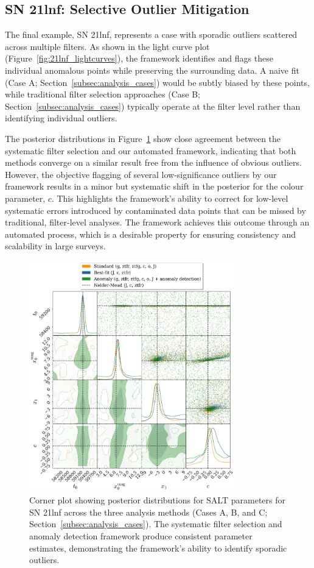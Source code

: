 \subsection{SN 21lnf: Selective Outlier Mitigation}
\label{subsec:sn21lnf}

The final example, SN 21lnf, represents a case with sporadic outliers scattered across multiple filters. As shown in the light curve plot (Figure~\ref{fig:21lnf_lightcurves}), the framework identifies and flags these individual anomalous points while preserving the surrounding data. A naive fit (Case A; Section~\ref{subsec:analysis_cases}) would be subtly biased by these points, while traditional filter selection approaches (Case B; Section~\ref{subsec:analysis_cases}) typically operate at the filter level rather than identifying individual outliers.

The posterior distributions in Figure~\ref{fig:21lnf_corner} show close agreement between the systematic filter selection and our automated framework, indicating that both methods converge on a similar result free from the influence of obvious outliers. However, the objective flagging of several low-significance outliers by our framework results in a minor but systematic shift in the posterior for the colour parameter, $c$. This highlights the framework's ability to correct for low-level systematic errors introduced by contaminated data points that can be missed by traditional, filter-level analyses. The framework achieves this outcome through an automated process, which is a desirable property for ensuring consistency and scalability in large surveys.

\begin{figure}
\centering
\includegraphics[width=0.8\textwidth]{images/corner_comparison_21lnf_paper_quality.png}
\caption{Corner plot showing posterior distributions for SALT parameters for SN 21lnf across the three analysis methods (Cases A, B, and C; Section~\ref{subsec:analysis_cases}). The systematic filter selection and anomaly detection framework produce consistent parameter estimates, demonstrating the framework's ability to identify sporadic outliers.}
\label{fig:21lnf_corner}
\end{figure}

